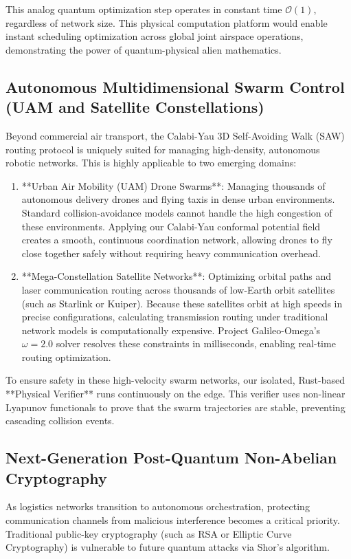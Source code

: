 \documentclass[11pt,a4paper]{book}
\begin{document}
This analog quantum optimization step operates in constant time $\mathcal{O}(1)$, regardless of network size. This physical computation platform would enable instant scheduling optimization across global joint airspace operations, demonstrating the power of quantum-physical alien mathematics.

\subsection{Autonomous Multidimensional Swarm Control (UAM and Satellite Constellations)}

Beyond commercial air transport, the Calabi-Yau 3D Self-Avoiding Walk (SAW) routing protocol is uniquely suited for managing high-density, autonomous robotic networks. This is highly applicable to two emerging domains:
\begin{enumerate}
    \item **Urban Air Mobility (UAM) Drone Swarms**: Managing thousands of autonomous delivery drones and flying taxis in dense urban environments. Standard collision-avoidance models cannot handle the high congestion of these environments. Applying our Calabi-Yau conformal potential field creates a smooth, continuous coordination network, allowing drones to fly close together safely without requiring heavy communication overhead.
    \item **Mega-Constellation Satellite Networks**: Optimizing orbital paths and laser communication routing across thousands of low-Earth orbit satellites (such as Starlink or Kuiper). Because these satellites orbit at high speeds in precise configurations, calculating transmission routing under traditional network models is computationally expensive. Project Galileo-Omega's $\omega = 2.0$ solver resolves these constraints in milliseconds, enabling real-time routing optimization.
\end{enumerate}

To ensure safety in these high-velocity swarm networks, our isolated, Rust-based **Physical Verifier** runs continuously on the edge. This verifier uses non-linear Lyapunov functionals to prove that the swarm trajectories are stable, preventing cascading collision events.

\subsection{Next-Generation Post-Quantum Non-Abelian Cryptography}

As logistics networks transition to autonomous orchestration, protecting communication channels from malicious interference becomes a critical priority. Traditional public-key cryptography (such as RSA or Elliptic Curve Cryptography) is vulnerable to future quantum attacks via Shor's algorithm. 
\end{document}
